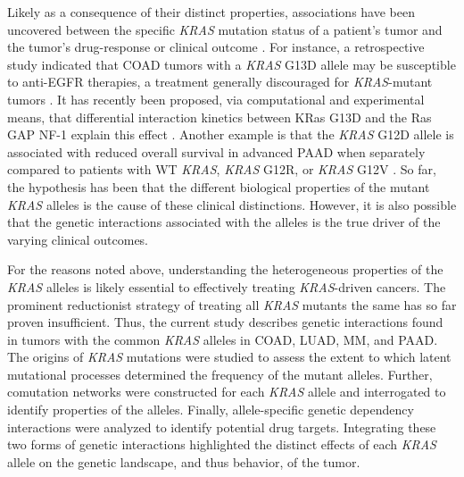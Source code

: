 \documentclass[english, 10pt, letterpaper]{article}
\newcommand{\KRAS}{\emph{KRAS}}
\newcommand{\kras}{KRas}
\begin{document}
Likely as a consequence of their distinct properties, associations have been uncovered between the specific \KRAS{} mutation status of a patient's tumor and the tumor's drug-response or clinical outcome \cite{Haigis2017, Li2018}.
For instance, a retrospective study indicated that COAD tumors with a \KRAS{} G13D allele may be susceptible to anti-EGFR therapies, a treatment generally discouraged for \KRAS{}-mutant tumors \cite{DeRoock2010}. 
It has recently been proposed, via computational and experimental means, that differential interaction kinetics between \kras{} G13D and the Ras GAP NF-1 explain this effect \cite{McFall2019, Rabara2019, Zafra2019}.
Another example is that the \KRAS{} G12D allele is associated with reduced overall survival in advanced PAAD when separately compared to patients with WT \KRAS{}, \KRAS{} G12R, or \KRAS{} G12V \cite{Bournet2016}.
So far, the hypothesis has been that the different biological properties of the mutant \KRAS{} alleles is the cause of these clinical distinctions.
However, it is also possible that the genetic interactions associated with the alleles is the true driver of the varying clinical outcomes.


For the reasons noted above, understanding the heterogeneous properties of the \KRAS{} alleles is likely essential to effectively treating \KRAS{}-driven cancers.
The prominent reductionist strategy of treating all \KRAS{} mutants the same has so far proven insufficient.
Thus, the current study describes genetic interactions found in tumors with the common \KRAS{} alleles in COAD, LUAD, MM, and PAAD.
The origins of \KRAS{} mutations were studied to assess the extent to which latent mutational processes determined the frequency of the mutant alleles.
Further, comutation networks were constructed for each \KRAS{} allele and interrogated to identify properties of the alleles.
Finally, allele-specific genetic dependency interactions were analyzed to identify potential drug targets.
Integrating these two forms of genetic interactions highlighted the distinct effects of each \KRAS{} allele on the genetic landscape, and thus behavior, of the tumor.
\end{document}
